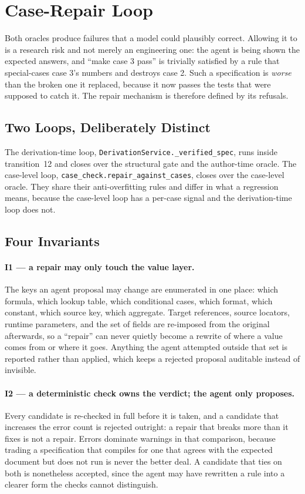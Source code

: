 \section{Case-Repair Loop}
\label{sec:der:repair}

Both oracles produce failures that a model could plausibly correct. Allowing it to is a research risk
and not merely an engineering one: the agent is being shown the expected answers, and ``make case 3
pass'' is trivially satisfied by a rule that special-cases case 3's numbers and destroys case 2. Such
a specification is \emph{worse} than the broken one it replaced, because it now passes the tests that
were supposed to catch it. The repair mechanism is therefore defined by its refusals.

\subsection{Two Loops, Deliberately Distinct}

The derivation-time loop, \texttt{DerivationService.\_verified\_spec}, runs inside transition~12 and
closes over the structural gate and the author-time oracle. The case-level loop,
\texttt{case\_check.repair\_against\_cases}, closes over the case-level oracle. They share their
anti-overfitting rules and differ in what a regression means, because the case-level loop has a
per-case signal and the derivation-time loop does not.

\subsection{Four Invariants}

\paragraph{I1 --- a repair may only touch the value layer.}
The keys an agent proposal may change are enumerated in one place: which formula, which lookup table,
which conditional cases, which format, which constant, which source key, which aggregate. Target
references, source locators, runtime parameters, and the set of fields are re-imposed from the
original afterwards, so a ``repair'' can never quietly become a rewrite of where a value comes from or
where it goes. Anything the agent attempted outside that set is reported rather than applied, which
keeps a rejected proposal auditable instead of invisible.

\paragraph{I2 --- a deterministic check owns the verdict; the agent only proposes.}
Every candidate is re-checked in full before it is taken, and a candidate that increases the error
count is rejected outright: a repair that breaks more than it fixes is not a repair. Errors dominate
warnings in that comparison, because trading a specification that compiles for one that agrees with
the expected document but does not run is never the better deal. A candidate that ties on both is
nonetheless accepted, since the agent may have rewritten a rule into a clearer form the checks cannot
distinguish.

